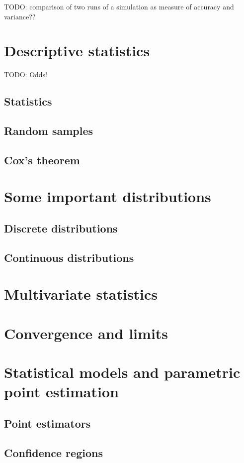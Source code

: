 TODO: comparison of two runs of a simulation as measure of accuracy and variance??

\chapter{Descriptive statistics}
TODO: Odds!


\section{Statistics}

\section{Random samples}

\section{Cox's theorem}

\chapter{Some important distributions}
\section{Discrete distributions}
\section{Continuous distributions}

\chapter{Multivariate statistics}

\chapter{Convergence and limits}

\chapter{Statistical models and parametric point estimation}
\section{Point estimators}
\section{Confidence regions}

